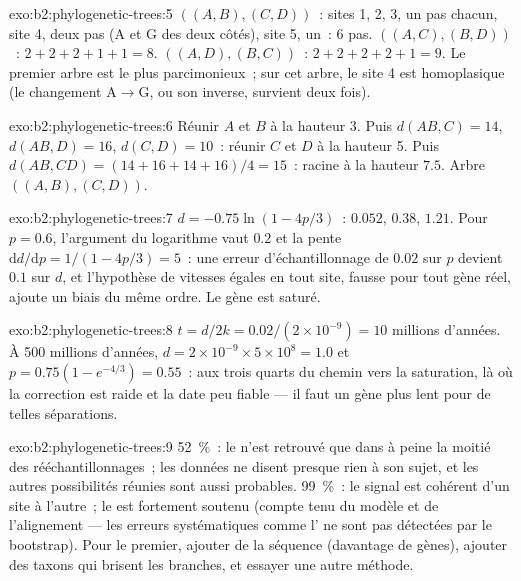 \begin{solution}{exo:b2:phylogenetic-trees:5}
$((A,B),(C,D))$~: sites 1, 2, 3, un pas chacun, site 4, deux pas
($\mathrm{A}$ et $\mathrm{G}$ des deux côtés), site 5, un~: 6 pas.
$((A,C),(B,D))$~: $2 + 2 + 2 + 1 + 1 = 8$. $((A,D),(B,C))$~: $2 + 2 + 2 +
2 + 1 = 9$. Le premier arbre est le plus parcimonieux~; sur cet arbre, le
site 4 est homoplasique (le changement $\mathrm{A}\to\mathrm{G}$, ou son
inverse, survient deux fois).
\end{solution}

\begin{solution}{exo:b2:phylogenetic-trees:6}
Réunir $A$ et $B$ à la hauteur 3. Puis $d(AB,C) = 14$, $d(AB,D) = 16$,
$d(C,D) = 10$~: réunir $C$ et $D$ à la hauteur 5. Puis $d(AB,CD) = (14 + 16
+ 14 + 16)/4 = 15$~: racine à la hauteur $7.5$. Arbre $((A,B),(C,D))$.
\end{solution}

\begin{solution}{exo:b2:phylogenetic-trees:7}
$d = -0.75\ln(1 - 4p/3)$~: $0.052$, $0.38$, $1.21$. Pour $p = 0.6$,
l'argument du logarithme vaut $0.2$ et la pente $\mathrm{d}d/\mathrm{d}p
= 1/(1 - 4p/3) = 5$~: une erreur d'échantillonnage de $0.02$ sur $p$ devient
$0.1$ sur $d$, et l'hypothèse de vitesses égales en tout site, fausse
pour tout gène réel, ajoute un biais du même ordre. Le gène est saturé.
\end{solution}

\begin{solution}{exo:b2:phylogenetic-trees:8}
$t = d/2k = 0.02/(2\times 10^{-9}) = 10$ millions d'années. À 500
millions d'années, $d = 2\times 10^{-9}\times 5\times 10^{8} = 1.0$ et
$p = 0.75(1 - e^{-4/3}) = 0.55$~: aux trois quarts du chemin vers la
saturation, là où la correction est raide et la date peu fiable
--- il faut un gène plus lent pour de telles séparations.
\end{solution}

\begin{solution}{exo:b2:phylogenetic-trees:9}
\qty{52}{\%}~: le  n'est retrouvé que dans à peine la moitié des
rééchantillonnages~; les données ne disent presque rien à son sujet, et
les autres possibilités réunies sont aussi probables. \qty{99}{\%}~: le
signal est cohérent d'un site à l'autre~; le  est fortement soutenu
(compte tenu du modèle et de l'alignement --- les erreurs systématiques
comme l' ne sont pas détectées par le
bootstrap). Pour le premier, ajouter de la séquence (davantage de gènes),
ajouter des taxons qui brisent les branches, et essayer une autre
méthode.
\end{solution}

